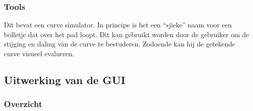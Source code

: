 \documentclass[a4paper,11pt,oneside, titlepage]{article}
\begin{document}
\subsubsection{Tools}
Dit bevat een curve simulator. In principe is het een ``sjieke'' naam voor een bolletje
dat over het pad loopt. Dit kan gebruikt worden door de gebruiker om de stijging en daling
van de curve te bestuderen. Zodoende kan hij de getekende curve visueel evalueren.
\subsection{Uitwerking van de GUI}
\subsubsection{Overzicht}
\end{document}
